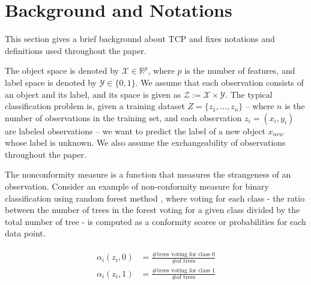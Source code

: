 \documentclass[main]{subfiles}
\begin{document}
\section{Background and Notations}
This section gives a brief background about TCP and fixes notations and definitions used throughout the paper.

The object space is denoted by $\mathcal{X} \in \mathbb{R}^p$, where $p$ is the number of features, and  label space is denoted by $\mathcal{Y} \in \{ 0,1 \}$. We assume that each observation consists of an object and its label, and its space is given as $\mathcal{Z} := \mathcal{X} \times \mathcal{Y}$. %
The typical classification problem is, given a training dataset $Z = \{ z_1 , ..., z_n \} $ -- where $n$ is the number of observations in the training set, and each observation $z_i = (x_i, y_i)$ are labeled observations -- we want to predict the label of a new object $x_{new}$ whose label is unknown. We also assume the exchangeability of observations throughout the paper.


The nonconformity measure is a function that measures the strangeness of an observation. Consider an example of non-conformity measure for binary classification
using  random forest method \cite{Breiman}, where voting for each class - 
the ratio between the number of trees in the forest voting for a given class divided by
the total number of tree - is computed as a 
conformity scores or probabilities for each data point. 

\begin{align} \label{eq:def_nonconformity}
\begin{split}
\alpha_i(z_i, 0) &= \frac{\#\text{trees voting for class 0}}{\#\text{of trees}}\\
\alpha_i(z_i, 1) &= \frac{\#\text{trees voting for class 1}}{\#\text{of trees}}
\end{split}
\end{align}
\end{document}
